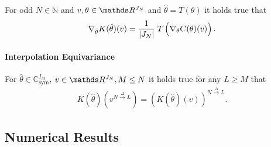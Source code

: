 \begin{lemma}{\cite[Lem. 4]{kabri2023resolution}}{}
For odd $N \in \mathbb{N}$ and $v, \theta \in \R^{J_N}$ and $\hat{\theta} = T(\theta)$ it holds true that
\begin{align*}
	\nabla_{\hat{\theta}} K(\hat{\theta})(v) = \frac{1}{|J_N|}\; T \left( \vphantom{\hat{\theta}} \nabla_{\theta}C(\theta)(v) \right). 
\end{align*}
\end{lemma}
%
%
\paragraph{Interpolation Equivariance}
\begin{corollary}
	For $\hat{\theta} \in \mathbb{C}^{I_M}_{\text{sym}}$, $v \in \R^{J_N}, M \leq N$ it holds true for any $L \geq M$ that
	\begin{align*}
		K(\hat{\theta})(v^{N \xrightarrow{\Delta} L}) = \left( K(\hat{\theta})(v) \right)^{N \xrightarrow{\Delta} L}.
	\end{align*}
\end{corollary}


\subsection{Numerical Results}
%
%
